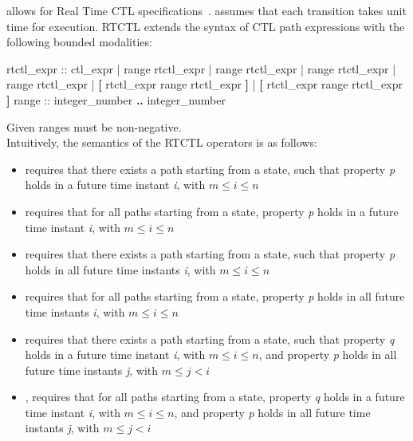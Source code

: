 \nusmv allows for Real Time CTL specifications~\cite{EMSS91}.
%
\nusmv assumes that each transition takes unit time for
execution.
%
RTCTL extends the syntax of CTL path expressions with the following
bounded modalities:
%
\begin{Grammar}
rtctl_expr ::
        ctl_expr
      |  range rtctl_expr
      |  range rtctl_expr
      |  range rtctl_expr
      |  range rtctl_expr
      |  \textbf{[} rtctl_expr  range rtctl_expr \textbf{]}
      |  \textbf{[} rtctl_expr  range rtctl_expr \textbf{]}
range  :: integer_number \textbf{..} integer_number
\end{Grammar}
%
Given ranges must be non-negative.\\
%
Intuitively, the semantics of the RTCTL operators is as follows:\\
%
\begin{itemize}
  \item {}
        requires that there exists a path starting from a state, such
        that property \textit{p} holds in a future time instant
        \textit{i}, with $m \leq i \leq n$
  \item {}
        requires that for all paths starting from a state, property
        \textit{p} holds in a future time instant \textit{i}, with $m
        \leq i \leq n$
  \item {}
        requires that there exists a path starting from a state, such
        that property \textit{p} holds in all future time instants
        \textit{i}, with $m \leq i \leq n$
  \item {}
        requires that for all paths starting from a state, property
        \textit{p} holds in all future time instants \textit{i}, with
        $m \leq i \leq n$
  \item {}
        requires that there exists a path starting from a state, such
        that property \textit{q} holds in a future time instant
        \textit{i}, with $m \leq i \leq n$, and property \textit{p}
        holds in all future time instants \textit{j}, with $m \leq j <
        i$
  \item {},
        requires that for all paths starting from a state, property
        \textit{q} holds in a future time instant \textit{i}, with $m
        \leq i \leq n$, and property \textit{p} holds in all future
        time instants \textit{j}, with $m \leq j < i$
\end{itemize}
